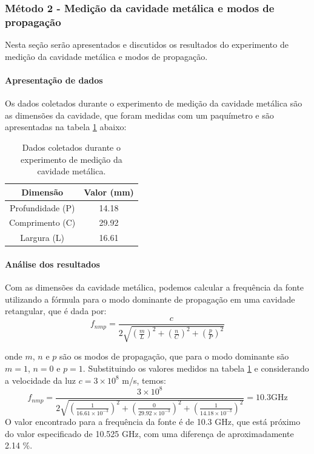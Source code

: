 \documentclass[12pt]{article}
\begin{document}
\subsubsection{Método 2 - Medição da cavidade metálica e modos de propagação}
Nesta seção serão apresentados e discutidos os resultados do experimento de
medição da cavidade metálica e modos de propagação.
\paragraph{Apresentação de dados}
Os dados coletados durante o experimento de medição da cavidade
metálica são as dimensões da cavidade, que foram medidas com um
paquímetro e são apresentadas na tabela \ref{tab:metodo2dados} abaixo:
\begin{table}[H]
  \centering
  \begin{tabular}{|c|c|}
    \hline
    Dimensão & Valor (mm) \\
    \hline
    Profundidade (P) & 14.18 \\
    Comprimento (C) & 29.92 \\
    Largura (L) & 16.61 \\
    \hline
  \end{tabular}
  \caption{Dados coletados durante o experimento de medição da
  cavidade metálica.}
  \label{tab:metodo2dados}
\end{table}
\paragraph{Análise dos resultados}
Com as dimensões da cavidade metálica, podemos calcular a
frequência da fonte utilizando a fórmula para o modo dominante de
propagação em uma cavidade retangular, que é dada por:
\begin{equation}
  f_{nmp} = \frac{c}{2\sqrt{\left(\frac{m}{L}\right)^2 +
  \left(\frac{n}{C}\right)^2 + \left(\frac{p}{P}\right)^2}}
\end{equation}

onde $m$, $n$ e $p$ são os modos de propagação, que para o modo
dominante são $m = 1$, $n = 0$ e $p = 1$. Substituindo os valores
medidos na tabela \ref{tab:metodo2dados} e considerando a velocidade
da luz $c = 3 \times 10^8$ m/s, temos:
\begin{equation}
  f_{nmp} = \frac{3 \times 10^8}{2\sqrt{\left(\frac{1}{16.61\times
      10^{-3}}\right)^2 + \left(\frac{0}{29.92 \times 10^{-3}}\right)^2 +
  \left(\frac{1}{14.18 \times 10^{-3}}\right)^2}} = 10.3 \text{GHz}
\end{equation}
O valor encontrado para a frequência da fonte é de 10.3 GHz, que
está próximo do valor especificado de 10.525 GHz, com uma diferença
de aproximadamente
2.14 \%.
\end{document}
